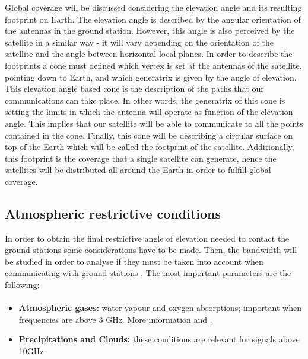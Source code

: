 Global coverage will be discussed considering the elevation angle and its resulting footprint on Earth. The elevation angle is described by the angular orientation of the antennas in the ground station. However, this angle is also perceived by the satellite in a similar way - it will vary depending on the orientation of the satellite and the angle between horizontal local planes. In order to describe the footprints a cone must defined which vertex is set at the antennas of the satellite, pointing down to Earth, and which generatrix is given by the angle of elevation. This elevation angle based cone is the description of the paths that our communications can take place. In other words, the generatrix of this cone is setting the limits in which the antenna will operate as function of the elevation angle. This implies that our satellite will be able to communicate to all the points contained in the cone. Finally, this cone will be describing a circular surface on top of the Earth which will be called the footprint of the satellite. Additionally, this footprint is the coverage that a single satellite can generate, hence the satellites will be distributed all around the Earth in order to fulfill global coverage. 



\subsection{Atmospheric restrictive conditions}
In order to obtain the final restrictive angle of elevation needed to contact the ground stations some considerations have to be made. Then, the bandwidth will be studied in order to analyse if they must be taken into account when communicating with ground stations \cite{Gomez2013}. The most important parameters are the following:
\paragraph{    }

\begin{itemize}



\item\textbf{ Atmospheric gases: }water vapour and oxygen absorptions; important when frequencies are above 3 GHz. More information \cite{Zubair2011} and \cite{Luini2015}.\\

\item\textbf{ Precipitations and Clouds: }these conditions are relevant for signals above 10GHz. \\


\end{itemize}
